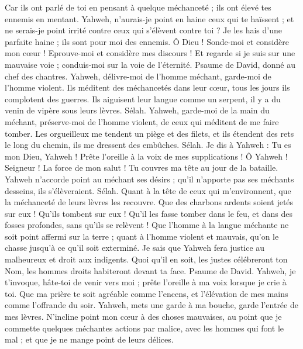 \begin{multicols}{2}
Car ils ont parlé de toi en pensant à quelque méchanceté ; ils ont élevé tes ennemis en mentant.
Yahweh, n'aurais-je point en haine ceux qui te haïssent ; et ne serais-je point irrité contre ceux qui s'élèvent contre toi ?
Je les hais d'une parfaite haine ; ils sont pour moi des ennemis.
Ô Dieu ! Sonde-moi et considère mon cœur ! Eprouve-moi et considère mes discours !
Et regarde si je suis sur une mauvaise voie ; conduis-moi sur la voie de l'éternité.
\VerseOne{}Psaume de David, donné au chef des chantres. Yahweh, délivre-moi de l'homme méchant, garde-moi de l'homme violent.
Ils méditent des méchancetés dans leur cœur, tous les jours ils complotent des guerres.
Ils aiguisent leur langue comme un serpent, il y a du venin de vipère sous leurs lèvres. Sélah.
Yahweh, garde-moi de la main du méchant, préserve-moi de l'homme violent, de ceux qui méditent de me faire tomber.
Les orgueilleux me tendent un piège et des filets, et ils étendent des rets le long du chemin, ils me dressent des embûches. Sélah.
Je dis à Yahweh : Tu es mon Dieu, Yahweh ! Prête l'oreille à la voix de mes supplications !
Ô Yahweh ! Seigneur ! La force de mon salut ! Tu couvres ma tête au jour de la bataille.
Yahweh n'accorde point au méchant ses désirs ; qu'il n'apporte pas ses méchants desseins, ils s'élèveraient. Sélah.
Quant à la tête de ceux qui m'environnent, que la méchanceté de leurs lèvres les recouvre.
Que des charbons ardents soient jetés sur eux ! Qu'ils tombent sur eux ! Qu'il les fasse tomber dans le feu, et dans des fosses profondes, sans qu'ils se relèvent !
Que l'homme à la langue méchante ne soit point affermi sur la terre ; quant à l'homme violent et mauvais, qu'on le chasse jusqu'à ce qu'il soit exterminé.
Je sais que Yahweh fera justice au malheureux et droit aux indigents.
Quoi qu'il en soit, les justes célébreront ton Nom, les hommes droits habiteront devant ta face.
\VerseOne{}Psaume de David. Yahweh, je t'invoque, hâte-toi de venir vers moi ; prête l'oreille à ma voix lorsque je crie à toi.
Que ma prière te soit agréable comme l'encens, et l'élévation de mes mains comme l'offrande du soir.
Yahweh, mets une garde à ma bouche, garde l'entrée de mes lèvres.
N'incline point mon cœur à des choses mauvaises, au point que je commette quelques méchantes actions par malice, avec les hommes qui font le mal ; et que je ne mange point de leurs délices.

\end{multicols}
